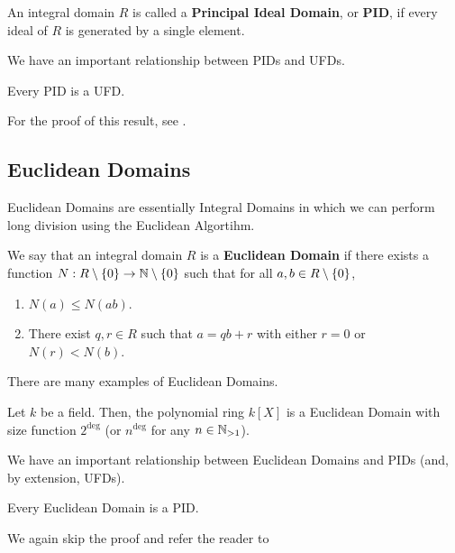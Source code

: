 \begin{boxdefinition}
    An integral domain $R$ is called a \textbf{Principal Ideal Domain}, or \textbf{PID}, if every ideal of $R$ is generated by a single element.
\end{boxdefinition}

We have an important relationship between PIDs and UFDs.

\begin{boxtheorem}
    Every PID is a UFD.
\end{boxtheorem}

For the proof of this result, see \cite[Theorem 1.2]{AmbrusPal}.

\subsection{Euclidean Domains}

Euclidean Domains are essentially Integral Domains in which we can perform long division using the Euclidean Algortihm.

\begin{boxdefinition}
    We say that an integral domain $R$ is a \textbf{Euclidean Domain} if there exists a function $N : R \setminus \left\{ 0 \right\} \to \mathbb{N} \setminus \left\{ 0 \right\}$ such that for all $a, b \in R \setminus \left\{ 0 \right\}$,
    \begin{enumerate}
        \item $N(a) \leq N(ab)$.
        \item There exist $q, r \in R$ such that $a = qb + r$ with either $r = 0$ or $N(r) < N(b)$.
    \end{enumerate}
\end{boxdefinition}

There are many examples of Euclidean Domains.

\begin{boxexample}
    Let $k$ be a field. Then, the polynomial ring $k[X]$ is a Euclidean Domain with size function $2^{\deg}$ (or $n^{\deg}$ for any $n \in \mathbb{N}_{>1}$).
\end{boxexample}

We have an important relationship between Euclidean Domains and PIDs (and, by extension, UFDs).

\begin{boxproposition}
    Every Euclidean Domain is a PID.
\end{boxproposition}

We again skip the proof and refer the reader to \cite{}

